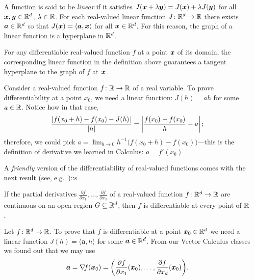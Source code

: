 \begin{remark}
A function is said to be \emph{linear} if it satisfies $J(\boldsymbol{x}+\lambda\boldsymbol{y}) = J(\boldsymbol{x}) + \lambda J(\boldsymbol{y})$ for all $\boldsymbol{x}, \boldsymbol{y} \in \mathbb{R}^d$, $\lambda \in \mathbb{R}$.  For each real-valued linear function $J \colon \mathbb{R}^d \to \mathbb{R}$ there exists $\boldsymbol{a} \in \mathbb{R}^d$ so that $J(\boldsymbol{x}) = \langle \boldsymbol{a} , \boldsymbol{x} \rangle$ for all $\boldsymbol{x} \in \mathbb{R}^d$.  For this reason, the graph of a linear function is a hyperplane in $\mathbb{R}^d$.
\end{remark}

\begin{remark}
For any differentiable real-valued function $f$ at a point $\boldsymbol{x}$ of its domain, the corresponding linear function in the definition above guarantees a tangent hyperplane to the graph of $f$ at $\boldsymbol{x}$.  
\end{remark}
 
\begin{example}\label{example:derivatives}
Consider a real-valued function $f\colon \mathbb{R} \to \mathbb{R}$ of a real variable. To prove differentiability at a point $x_0$, we need a linear function: $J(h)=ah$ for some $a\in \mathbb{R}$. Notice how in that case, 
\begin{equation*}
\frac{\lvert f(x_0+h)-f(x_0)-J(h) \rvert}{\lvert h \rvert} = \left\lvert \frac{f(x_0)-f(x_0)}{h} - a \right\lvert;
\end{equation*}
therefore, we could pick $a = \lim_{h\to 0} h^{-1}\big( f(x_0+h) - f(x_0) \big)$---this is the definition of derivative we learned in Calculus: $a=f'(x_0)$
\end{example}

A \emph{friendly} version of the differentiability of real-valued functions comes with the next result (see, e.g.~\cite[p.818]{finney2001thomas})::s
\begin{theorem}
If the partial derivatives $\frac{\partial f}{\partial x_1}, \dotsc, \frac{\partial f}{\partial x_d}$ of a real-valued function $f \colon \mathbb{R}^d \to \mathbb{R}$ are continuous on an open region $G \subseteq \mathbb{R}^d$, then $f$ is differentiable at every point of $\mathbb{R}$.
\end{theorem}

\begin{example}\label{example:gradient}
Let $f\colon \mathbb{R}^d \to \mathbb{R}$.  To prove that $f$ is differentiable at a point $\boldsymbol{x}_0 \in \mathbb{R}^d$ we need a linear function $J(h) = \langle \boldsymbol{a}, h \rangle$ for some $\boldsymbol{a} \in \mathbb{R}^d$.  From our Vector Calculus classes we found out that we may use
\begin{equation*}
\boldsymbol{a} = \mathop{\nabla\! {f}}(\boldsymbol{x}_0)= \bigg( \frac{\partial f}{\partial x_1}(\boldsymbol{x}_0), \dotsc, \frac{\partial f}{\partial x_d}(\boldsymbol{x}_0) \bigg).
\end{equation*}
\end{example}

